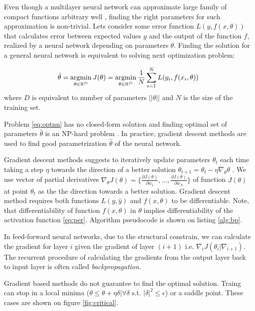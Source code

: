 Even though a multilayer neural network can approximate large family of compact functions arbitrary well \cite{Debao1993}, finding the right parameters for such approximation is non-trivial.
Lets consider some error function $L(y, f(x, \theta))$ that calculates error between expected values $y$ and the output of the function $f$, realized by a neural network depending on parameters $\theta$. Finding the solution for a general neural network is equivalent to solving next optimization problem:

\begin{equation}\label{eq:optnn}
  \hat{\theta} = \operatorname*{argmin}_{\theta \in \Bbb{R}^D} J(\theta) = \operatorname*{argmin}_{\theta \in \Bbb{R}^D} \frac{1}{N} \sum_{i=1}^{N} L(y_i, f(x_i, \theta))
\end{equation}
where $D$ is equivalent to number of parameters $||\theta||$ and $N$ is the size of the training set.

Problem \ref{eq:optnn} has no closed-form solution and finding optimal set of parameters $\hat{\theta}$ is an NP-hard problem \cite{Anandkumar16}.
In practice, gradient descent methods are used to find good parametrization $\hat{\theta}$ of the neural network.

Gradient descent methods suggests to iteratively update parameters $\theta_t$ each time taking a step $\eta$ towards the direction of a better solution $\theta_{t+1}=\theta_t - \eta \nabla_\theta \theta$ \cite{Cauchy1847}.
We use vector of partial derivatives $\nabla_\theta J(\theta)=\{ \frac{\partial J(\theta)}{\partial w_1}, \ldots, \frac{\partial J(\theta)}{\partial w_N} \}$ of function $J(\theta)$ at point $\theta_t$ as the the direction towards a better solution. Gradient descent method requires both functions $L(y, \hat{y})$ and $f(x, \theta)$ to be differentiable. Note, that differentiability of function $f(x, \theta)$ in $\theta$ implies differentiability of the activation function \ref{eq:per}. Algorithm pseudocode is shown on listing \ref{alg:bp}.



In feed-forward neural networks, due to the structural constrain, we can calculate the gradient for layer $i$ given the gradient of layer $(i+1)$ i.e. $\nabla_i J(\theta_i|\nabla_{i+1})$. The recurrent procedure of calculating the gradients from the output layer back to input layer is often called \textit{backpropagation}.


Gradient based methods do not guarantee to find the optimal solution.
Traing can stop in a local minima ($\theta \leq \theta + \eta \delta | \forall \delta \text{ s.t. } |\delta|^2 \leq \epsilon$) or a saddle point.
These cases are shown on figure \ref{fig:critical}.


